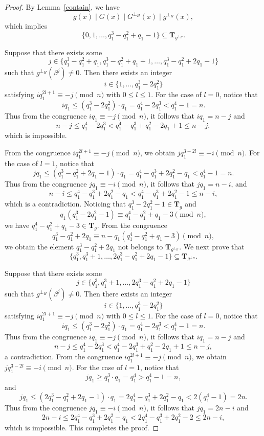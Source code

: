 \documentclass[journal,12pt,onecolumn]{IEEEtran}
\begin{document}
\begin{proof}
By Lemma~\ref{contain}, we have
\[
g(x) \mid G(x) \mid G^{\perp_H}(x) \mid g^{\perp_H}(x),
\]
which implies
\[
\{0,1,\dots,q_1^3 - q_1^2 + q_1 - 1\} \subseteq \mathbf{T}_{g^{\perp_H}}.
\]

Suppose that there exists some
\[
j \in \{q_1^3 - q_1^2 + q_1, q_1^3 - q_1^2 + q_1 + 1, \dots, q_1^3 - q_1^2 + 2q_1 - 1\}
\]
such that $g^{\perp_H}(\beta^j) \ne 0$. Then there exists an integer
\[
i \in \{1, \dots, q_1^3 - 2q_1^2\}
\]
satisfying
\(
i q_1^{2l+1} \equiv -j \pmod{n}
\) with $0\le l \le 1$. For the case of $l = 0$, notice that
\[
i q_1 \le (q_1^3 - 2q_1^2) \cdot q_1 = q_1^4 - 2q_1^3 < q_1^4 - 1 = n.
\]
Thus from the congruence $i q_1\equiv -j \pmod n$, it follows that $i q_1 = n - j$ and
\[
n - j \le q_1^4 - 2q_1^3
< q_1^4 - q_1^3 + q_1^2 - 2q_1 + 1
\le n - j,
\]
which is impossible.

From the congruence $i q_1^{2l+1}\equiv -j \pmod n$, we obtain $j q_1^{3-2l}\equiv -i\pmod n$. For the case of $l = 1$, notice that
\[
j q_1 \le (q_1^3 - q_1^2 + 2q_1 - 1) \cdot q_1
= q_1^4 - q_1^3 + 2q_1^2 - q_1
< q_1^4 - 1 = n.
\]
Thus from the congruence $j q_1\equiv -i \pmod n$, it follows that $j q_1 = n - i$, and
\[
n - i \le q_1^4 - q_1^3 + 2q_1^2 - q_1
< q_1^4 - q_1^3 + 2q_1^2 - 1
\le n - i,
\]
which is a contradiction. Noticing that $q_1^3 - 2q_1^2 - 1 \in \mathbf{T}_g$ and
\[
q_1(q_1^3 - 2q_1^2 - 1) \equiv q_1^4 - q_1^2 + q_1 - 3 \pmod{n},
\]
we have $q_1^4 - q_1^2 + q_1 - 3 \in \mathbf{T}_g$. From the congruence
\[
q_1^3 - q_1^2 + 2q_1 \equiv n - q_1(q_1^4 - q_1^2 + q_1 - 3) \pmod{n},
\]
we obtain the element $q_1^3 - q_1^2 + 2q_1$ not belongs to $\mathbf{T}_{g^{\perp_H}}$. We next prove that
\[
\{q_1^3, q_1^3 + 1, \dots, 2q_1^3 - q_1^2 + 2q_1 - 1\} \subseteq \mathbf{T}_{g^{\perp_H}}.
\]

Suppose that there exists some
\[
j \in \{q_1^3, q_1^3 + 1, \dots, 2q_1^3 - q_1^2 + 2q_1 - 1\}
\]
such that $g^{\perp_H}(\beta^j) \ne 0$. Then there exists an integer
\[
i \in \{1, \dots, q_1^3 - 2q_1^2\}
\]
satisfying
\(
i q_1^{2l+1} \equiv -j \pmod{n}
\) with $0\le l \le 1$. For the case of $l = 0$, notice that
\[
i q_1 \le (q_1^3 - 2q_1^2) \cdot q_1 = q_1^4 - 2q_1^3 < q_1^4 - 1 = n.
\]
Thus from the congruence $i q_1\equiv -j\pmod n$, it follows that $i q_1 = n - j$ and
\[
n - j \le q_1^4 - 2q_1^3
< q_1^4 - 2q_1^3 + q_1^2 - 2q_1 + 1
\le n - j,
\]
a contradiction. From the congruence $i q_1^{2l+1}\equiv -j \pmod n$, we obtain $j q_1^{3-2l}\equiv -i\pmod n$. For the case of $l = 1$, notice that
\[
j q_1 \ge q_1^3 \cdot q_1 = q_1^4 > q_1^4 - 1 = n,
\]
and
\[
j q_1 \le (2q_1^3 - q_1^2 + 2q_1 - 1) \cdot q_1
= 2q_1^4 - q_1^3 + 2q_1^2 - q_1
< 2(q_1^4 - 1) = 2n.
\]
Thus from the congruence $j q_1\equiv -i \pmod n$, it follows that $j q_1 = 2n - i$ and
\[
2n - i \le 2q_1^4 - q_1^3 + 2q_1^2 - q_1
< 2q_1^4 - q_1^3 + 2q_1^2 - 2
\le 2n - i,
\]
which is impossible. This completes the proof.
\end{proof}
\end{document}
